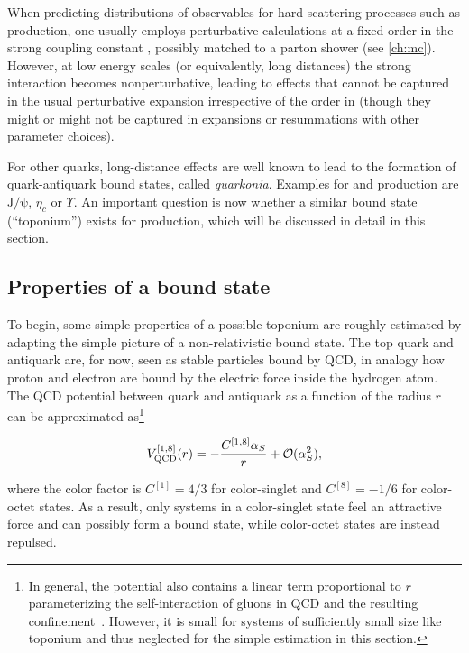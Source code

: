 When predicting distributions of observables for hard scattering processes such as \ttbar production, one usually employs perturbative calculations at a fixed order in the strong coupling constant \alphas, possibly matched to a parton shower (see \cref{ch:mc}). However, at low energy scales (or equivalently, long distances) the strong interaction becomes nonperturbative, leading to effects that cannot be captured in the usual perturbative expansion irrespective of the order in \alphas (though they might or might not be captured in expansions or resummations with other parameter choices).

For other quarks, long-distance effects are well known to lead to the formation of quark-antiquark bound states, called \textit{quarkonia}. Examples for \ccbar and \bbbar production are $\mathrm{J/\psi}$, $\eta_c$ or $\Upsilon$. An important question is now whether a similar bound state (``toponium'') exists for \ttbar production, which will be discussed in detail in this section.

\subsection{Properties of a \ttbartitle bound state}
\label{sec:theory:toponium_properties}

To begin, some simple properties of a possible toponium are roughly estimated by adapting the simple picture of a non-relativistic bound state. The top quark and antiquark are, for now, seen as stable particles bound by QCD, in analogy how proton and electron are bound by the electric force inside the hydrogen atom. The QCD potential between quark and antiquark as a function of the radius $r$ can be approximated as\footnote{In general, the potential also contains a linear term proportional to $r$ parameterizing the self-interaction of gluons in QCD and the resulting confinement~\cite{Deur:2016tte}. However, it is small for systems of sufficiently small size like toponium and thus neglected for the simple estimation in this section.}

\begin{equation}
  V_{\mathrm{QCD}}^{[1,8]} (r) = - \frac{C^{[1,8]} \alpha_S}{r} + \mathcal{O}(\alpha_S^2) ,
\end{equation}

\noindent where the color factor is $C^{[1]} = 4/3$ for color-singlet and $C^{[8]} = -1/6$ for color-octet \ttbar states. As a result, only \ttbar systems in a color-singlet state feel an attractive force and can possibly form a bound state, while color-octet states are instead repulsed.

